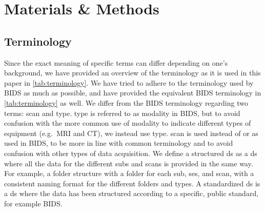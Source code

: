 \section{Materials \& Methods}
\subsection{Terminology}

Since the exact meaning of specific terms can differ depending on one's background, we have provided an overview of the terminology as it is used in this paper in \cref{tab:terminology}.
We have tried to adhere to the terminology used by \gls{BIDS} as much as possible, and have provided the equivalent \gls{BIDS} terminology in \cref{tab:terminology} as well.
We differ from the \gls{BIDS} terminology regarding two terms: \gls{scan} and \gls{type}.
\Gls{type} is referred to as modality in \gls{BIDS}, but to avoid confusion with the more common use of modality to indicate different types of equipment (e.g.\ \gls{MRI} and \gls{CT}), we instead use \gls{type}.
\Gls{scan} is used instead of  or  as used in \gls{BIDS}, to be more in line with common terminology and to avoid confusion with other types of data acquisition.
We define a structured \gls{ds} as a \gls{ds} where all the data for the different \glspl{sub} and \glspl{scan} is provided in the same way.
For example, a folder structure with a folder for each \gls{sub}, \gls{ses}, and \gls{scan}, with a consistent naming format for the different folders and \glspl{type}.
A standardized \gls{ds} is a \gls{ds} where the data has been structured according to a specific, public standard, for example \gls{BIDS}.


